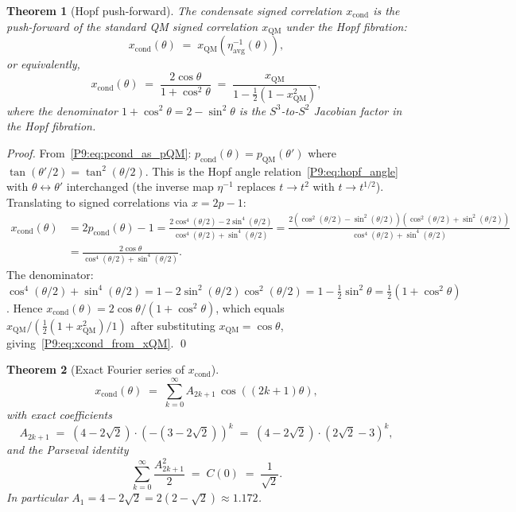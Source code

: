 \documentclass[11pt,a4paper]{article}
\newtheorem{theorem}{Theorem}[section]
\theoremstyle{definition}
\theoremstyle{remark}
\newcommand{\pcond}{p_{\mathrm{cond}}}
\newcommand{\pQM}{p_{\mathrm{QM}}}
\newcommand{\xcond}{x_{\mathrm{cond}}}
\begin{document}
\begin{theorem}[Hopf push-forward]
\label{P9:thm:hopf_pushforward}
The condensate signed correlation $\xcond$ is the push-forward of the
standard QM signed correlation $x_\mathrm{QM}$ under the Hopf fibration:
\begin{equation}
  \xcond(\theta) \;=\; x_\mathrm{QM}(\eta^{-1}_\mathrm{avg}(\theta)),
  \label{P9:eq:hopf_pushforward}
\end{equation}
or equivalently,
\begin{equation}
  \xcond(\theta) \;=\; \frac{2\cos\theta}{1+\cos^2\theta}
  \;=\; \frac{x_\mathrm{QM}}{1 - \tfrac{1}{2}(1-x_\mathrm{QM}^2)},
  \label{P9:eq:xcond_from_xQM}
\end{equation}
where the denominator $1+\cos^2\theta = 2-\sin^2\theta$ is the
$S^3$-to-$S^2$ Jacobian factor in the Hopf fibration.
\end{theorem}
 
\begin{proof}
From~\eqref{P9:eq:pcond_as_pQM}: $\pcond(\theta) = \pQM(\theta')$ where
$\tan(\theta'/2) = \tan^2(\theta/2)$.
This is the Hopf angle relation~\eqref{P9:eq:hopf_angle} with
$\theta\leftrightarrow\theta'$ interchanged (the inverse map $\eta^{-1}$
replaces $t\to t^2$ with $t\to t^{1/2}$).
Translating to signed correlations via $x=2p-1$:
\begin{align*}
  \xcond(\theta) &= 2\pcond(\theta)-1
  = \frac{2\cos^4(\theta/2)-2\sin^4(\theta/2)}{\cos^4(\theta/2)+\sin^4(\theta/2)}
  = \frac{2(\cos^2(\theta/2)-\sin^2(\theta/2))(\cos^2(\theta/2)+\sin^2(\theta/2))}
         {\cos^4(\theta/2)+\sin^4(\theta/2)}\\
  &= \frac{2\cos\theta}{\cos^4(\theta/2)+\sin^4(\theta/2)}.
\end{align*}
The denominator: $\cos^4(\theta/2)+\sin^4(\theta/2) = 1 - 2\sin^2(\theta/2)\cos^2(\theta/2)
= 1 - \tfrac{1}{2}\sin^2\theta = \tfrac{1}{2}(1+\cos^2\theta)$.
Hence $\xcond(\theta) = 2\cos\theta/(1+\cos^2\theta)$, which equals
$x_\mathrm{QM}/(\tfrac{1}{2}(1+x_\mathrm{QM}^2)/1)$ after substituting
$x_\mathrm{QM}=\cos\theta$, giving~\eqref{P9:eq:xcond_from_xQM}.
\qed
\end{proof}
 
\begin{theorem}[Exact Fourier series of $\xcond$]
\label{P9:thm:fourier_exact}
\begin{equation}
  \xcond(\theta)
  \;=\; \sum_{k=0}^{\infty} A_{2k+1}\,\cos((2k+1)\theta),
  \label{P9:eq:xcond_fourier}
\end{equation}
with \emph{exact} coefficients
\begin{equation}
  \boxed{A_{2k+1}
  \;=\; (4-2\sqrt{2})\cdot(-(3-2\sqrt{2}))^k
  \;=\; (4-2\sqrt{2})\cdot(2\sqrt{2}-3)^k},
  \label{P9:eq:A_exact}
\end{equation}
and the Parseval identity
\begin{equation}
  \boxed{\sum_{k=0}^{\infty} \frac{A_{2k+1}^2}{2}
  \;=\; C(0) \;=\; \frac{1}{\sqrt{2}}}.
  \label{P9:eq:parseval_exact}
\end{equation}
In particular $A_1 = 4-2\sqrt{2} = 2(2-\sqrt{2})\approx1.172$.
\end{theorem}
 
\end{document}

